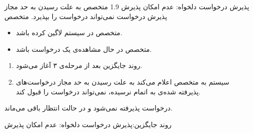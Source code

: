 {\alternativeflow
{
پذیرش درخواست دلخواه:  عدم امکان پذیرش
}
{1.9}
{
	متخصص به علت رسیدن به حد مجاز پذیرش درخواست نمی‌تواند درخواست را بپذیرد.
}
{
	متخصص
}
{}
{
	\begin{itemize}
		\vspace*{-0.6cm}
		\item 
		متخصص در سیستم لاگین کرده باشد.
		\item
		متخصص در حال مشاهده‌ی یک درخواست باشد.
	\end{itemize}
}
{
	\vspace*{-0.6cm}
	\begin{enumerate}
		\item 
		روند جایگزین بعد از مرحله‌ی ۳ آغاز می‌شود.
		\item
		سیستم به متخصص اعلام می‌کند به علت رسیدن به حد مجاز درخواست‌های پذیرفته شده‌ی به اتمام نرسیده، نمی‌تواند درخواست را قبول کند.
		
	\end{enumerate}
}
{
	درخواست پذیرفته نمی‌شود و در حالت انتظار باقی می‌ماند.
	
}
{
	روند جایگزین:پذیرش درخواست دلخواه: عدم امکان پذیرش
}

}

